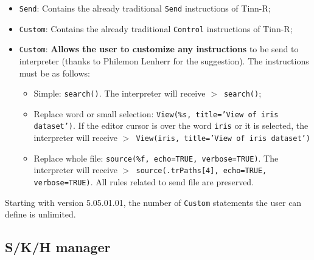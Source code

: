 \begin{itemize}
\item \texttt{Send}: Contains the already traditional \texttt{Send} instructions of Tinn-R;
\item \texttt{Custom}: Contains the already traditional \texttt{Control} instructions of Tinn-R;
\item \texttt{Custom}: \textbf{Allows the user to customize any instructions} to be send to \RR{} interpreter (thanks to Philemon Lenherr for the suggestion). The instructions must be as follows:
 \begin{itemize}
 \item Simple: \texttt{search()}. The \RR{} interpreter will receive \texttt{$>$ search()};
 \item Replace word or small selection: \texttt{View(\%s, title='View of iris dataset')}.
   If the editor cursor is over the word \texttt{iris} or it is selected,
   the \RR{} interpreter will receive \texttt{$>$ View(iris, title='View of iris dataset')}
 \item Replace whole file: \texttt{source(\%f, echo=TRUE, verbose=TRUE)}.
   The \RR{} interpreter will receive \texttt{$>$ source(.trPaths[4], echo=TRUE, verbose=TRUE)}.
   All rules related to send file are preserved.
 \end{itemize}
\end{itemize}

Starting with version 5.05.01.01, the number of \texttt{Custom} statements the user can define is unlimited.

\hypertarget{dlg_skh_manager}{}
\subsection{S/K/H manager}


